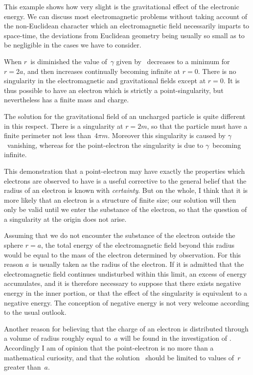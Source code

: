 \documentclass[12pt]{book}
\begin{document}
This example shows how very slight is the gravitational effect of the
electronic energy. We can discuss most electromagnetic problems without
taking account of the non-Euclidean character which an electromagnetic field
necessarily imparts to space-time, the deviations from Euclidean geometry
being usually so small as to be negligible in the cases we have to consider.

When $r$~is diminished the value of~$\gamma$ given by~ decreases to a minimum
for $r = 2a$, and then increases continually becoming infinite at $r = 0$. There is
no singularity in the electromagnetic and gravitational fields except at $r = 0$.
It is thus possible to have an electron which is strictly a point-singularity,
but nevertheless has a finite mass and charge.

The solution for the gravitational field of an uncharged particle is quite
different in this respect. There is a singularity at $r = 2m$, so that the particle
must have a finite perimeter not less than~$4\pi m$. Moreover this singularity is
caused by $\gamma$~vanishing, whereas for the point-electron the singularity is due
%
to $\gamma$~becoming infinite.

This demonstration that a point-electron may have exactly the properties
which electrons are observed to have is a useful corrective to the general belief
that the radius of an electron is known with \emph{certainty}. But on the whole,
I think that it is more likely that an electron is a structure of finite size; our
solution will then only be valid until we enter the substance of the electron,
so that the question of a singularity at the origin does not arise.

Assuming that we do not encounter the substance of the electron outside
the sphere $r = a$, the total energy of the electromagnetic field beyond this
radius would be equal to the mass of the electron determined by observation.
For this reason $a$~is usually taken as the radius of the electron. If it is
admitted that the electromagnetic field continues undisturbed within this
limit, an excess of energy accumulates, and it is therefore necessary to suppose
that there exists negative energy in the inner portion, or that the effect of
the singularity is equivalent to a negative energy. The conception of negative
energy is not very welcome according to the usual outlook.

Another reason for believing that the charge of an electron is distributed
through a volume of radius roughly equal to~$a$ will be found in the investigation
of . Accordingly I am of opinion that the point-electron is no more
than a mathematical curiosity, and that the solution~ should be limited
to values of~$r$ greater than~$a$.
\end{document}
